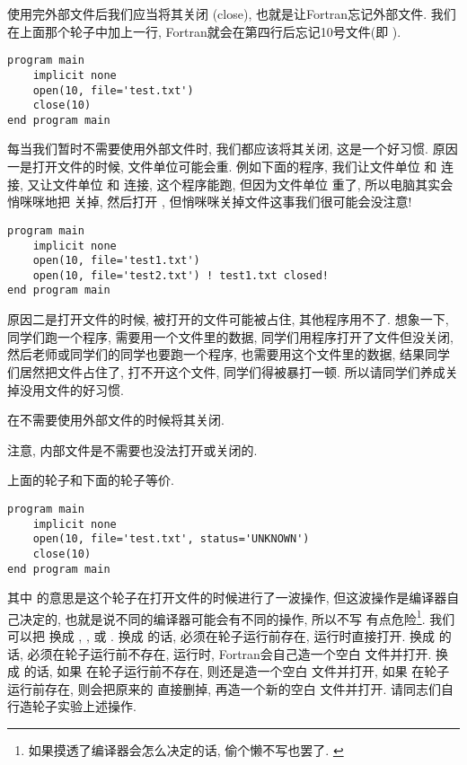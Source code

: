 使用完外部文件后我们应当将其关闭 (close), 也就是让Fortran忘记外部文件. 我们在上面那个轮子中加上一行, Fortran就会在第四行后忘记10号文件(即  ). 
\begin{lstlisting}
program main
    implicit none
    open(10, file='test.txt')
    close(10)
end program main
\end{lstlisting}

每当我们暂时不需要使用外部文件时, 我们都应该将其关闭, 这是一个好习惯. 原因一是打开文件的时候, 文件单位可能会重. 例如下面的程序, 我们让文件单位  和  连接, 又让文件单位  和  连接, 这个程序能跑, 但因为文件单位  重了, 所以电脑其实会悄咪咪地把  关掉, 然后打开 , 但悄咪咪关掉文件这事我们很可能会没注意!
\begin{lstlisting}
program main
    implicit none
    open(10, file='test1.txt')
    open(10, file='test2.txt') ! test1.txt closed!
end program main
\end{lstlisting}
原因二是打开文件的时候, 被打开的文件可能被占住, 其他程序用不了. 想象一下, 同学们跑一个程序, 需要用一个文件里的数据, 同学们用程序打开了文件但没关闭, 然后老师或同学们的同学也要跑一个程序, 也需要用这个文件里的数据, 结果同学们居然把文件占住了, 打不开这个文件, 同学们得被暴打一顿. 所以请同学们养成关掉没用文件的好习惯.
\begin{convention}
    在不需要使用外部文件的时候将其关闭. 
\end{convention}

注意, 内部文件是不需要也没法打开或关闭的. 

上面的轮子和下面的轮子等价. 
\begin{lstlisting}
program main
    implicit none
    open(10, file='test.txt', status='UNKNOWN')
    close(10)
end program main
\end{lstlisting}
其中   的意思是这个轮子在打开文件的时候进行了一波操作, 但这波操作是编译器自己决定的, 也就是说不同的编译器可能会有不同的操作, 所以不写  有点危险\footnote{如果摸透了编译器会怎么决定的话, 偷个懒不写也罢了. \label{no_add}}. 我们可以把  换成 , , 或 . 换成  的话,  必须在轮子运行前存在, 运行时直接打开. 换成  的话,  必须在轮子运行前不存在, 运行时, Fortran会自己造一个空白  文件并打开. 换成  的话, 如果  在轮子运行前不存在, 则还是造一个空白  文件并打开, 如果  在轮子运行前存在, 则会把原来的  直接删掉, 再造一个新的空白  文件并打开. 请同志们自行造轮子实验上述操作.

